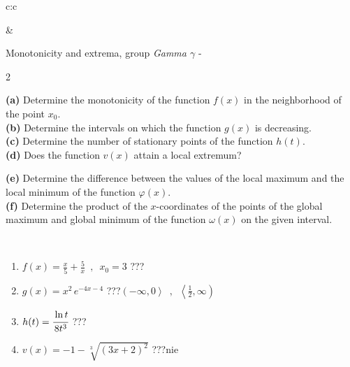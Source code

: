 \documentclass[10pt]{report}
\begin{document}
\begin{tabular}{c:c}
\begin{minipage}[c][104.5mm][t]{0.5\linewidth}
\begin{center}
\end{center}
\end{minipage}
&
\begin{minipage}[c][104.5mm][t]{0.5\linewidth}
\begin{center}
\vspace{5mm}
{\huge Monotonicity and extrema, group \textit{Gamma $\gamma$} -}\\[5mm]
\begin{minipage}{0.95\linewidth}
\begin{center}
{\small \begin{multicols}{2} \raggedright
\textbf{(a)} Determine the monotonicity of the function \(f(x)\) in the neighborhood of the point \(x_0\). \\[1mm]
\textbf{(b)} Determine the intervals on which the function \(g(x)\) is decreasing. \\[1mm]
\textbf{(c)} Determine the number of stationary points of the function \(h(t)\). \\[1mm]
\textbf{(d)} Does the function \(v(x)\) attain a local extremum? \par \columnbreak
\textbf{(e)} Determine the difference between the values of the local maximum and the local minimum of the function \(\varphi(x)\). \\[1mm]
\textbf{(f)} Determine the product of the \(x\)-coordinates of the points of the global maximum and global minimum of the function \(\omega(x)\) on the given interval. \\[1mm]
\end{multicols}
}
\end{center}
\end{minipage}
\\[1mm]
\begin{minipage}{0.79\linewidth}
\begin{center}
\begin{varwidth}{\linewidth}
\setlength{\itemsep}{0pt}
\begin{enumerate}
\normalsize
\item $f(x)=\frac{x}{5}+\frac{5}{x} \enspace , \enspace x_0=3$\quad \dotfill\; ???\;\dotfill \quad {}
\item $g(x)=x^2\, e^{-4x-4}$\quad \dotfill\; ???\;\dotfill \quad $\left(-\infty , 0\right\rangle\enspace , \enspace \left\langle\frac{1}{2} , \infty\right)$
\item $h(t)=\cfrac{\ln t}{8t^3}$\quad \dotfill\; ???\;\dotfill {}
\item $v(x)=-1-\sqrt[3]{(3x+2)^2}$\quad \dotfill\; ???\;\dotfill \quad $\text{nie}$

\end{enumerate}
\end{varwidth}
\end{center}
\end{minipage}
\end{center}
\end{minipage}
\end{tabular}
\end{document}
